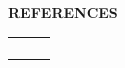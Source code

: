 %
%
%
%
%



\vspace{\spaceSection}
\begin{center}
    \textbf{REFERENCES}
\end{center}
\vspace{\spaceSection}

\begin{center}
    \begin{tabular}{ m{6cm} m{6cm} m{6cm} }
               &          &  \\
          &     &  \\
          &     &  \\
           &      & 
    \end{tabular}
\end{center}

